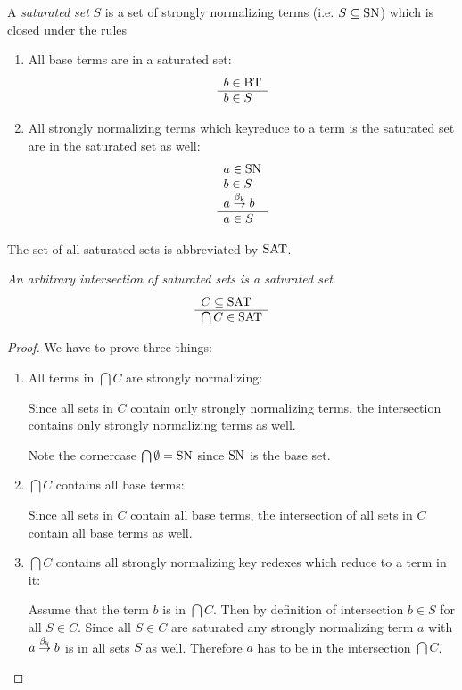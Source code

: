 \begin{definition}
    A \emph{saturated set} $S$ is a set of strongly normalizing terms (i.e. $S
    \subseteq \text{SN}$) which is closed under the rules
    \begin{enumerate}
    \item All base terms are in a saturated set:
        $$ \begin{array}{l} b \in \text{BT} \\ \hline b \in S\end{array}$$

    \item All strongly normalizing terms which keyreduce to a term is the
        saturated set are in the saturated set as well:
            $$
            \begin{array}{l} 
                a \in \text{SN}
                \\
                b \in S
                \\
                a \stackrel{\beta_{\text{k}}}{\to} b
             \\ \hline 
                a \in S
            \end{array}
            $$
    \end{enumerate}
    The set of all saturated sets is abbreviated by $\text{SAT}$.
\end{definition}



\begin{theorem}
    \label{SaturatedSetsIntersection}
    \emph{An arbitrary intersection of saturated sets is a saturated set}.
    $$
    \begin{array}{l} 
        C \subseteq \text{SAT}
     \\ \hline 
        \bigcap C \in \text{SAT}
    \end{array}
    $$
    \begin{proof}
        We have to prove three things:
        \begin{enumerate}
        \item All terms in $\bigcap C$ are strongly normalizing:

            Since all sets in $C$ contain only strongly normalizing
            terms, the intersection contains only strongly normalizing terms
            as well.

            Note the cornercase $\bigcap \emptyset = \text{SN}$ since $\text{SN}$ is the
                base set.

        \item $\bigcap C$ contains all base terms:

            Since all sets in $C$ contain all base terms, the intersection of
            all sets in $C$ contain all base terms as well.

        \item $\bigcap C$ contains all strongly normalizing key redexes which
            reduce to a term in it:

            Assume that the term $b$ is in $\bigcap C$. Then by definition of
                intersection $b \in S$ for all $S \in C$. Since all $S \in C$
                are saturated any strongly normalizing term $a$ with $a
                \stackrel{\beta_{\text{k}}}{\to} b$ is in all sets $S$ as well. Therefore $a$ has to
                be in the intersection $\bigcap C$.
        \end{enumerate}
    \end{proof}
\end{theorem}

